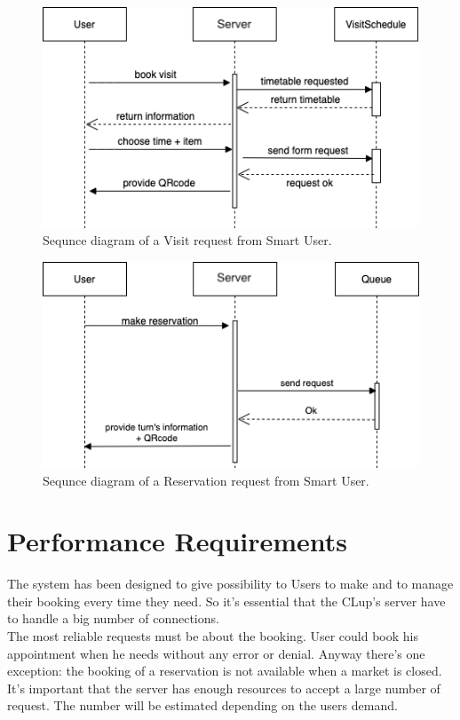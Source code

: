 \begin{figure}[H]
  \caption{Sequnce diagram of a Visit request from Smart User.}
  \label{fig:SD_visit}
  \centering
  \includegraphics[scale=0.45]{diagrams/SD_visit.png}

\end{figure}
\begin{figure}[H]
  \caption{Sequnce diagram of a Reservation request from Smart User.}
  \label{fig:SD_reservation}
  \centering
  \includegraphics[scale=0.45]{diagrams/SD_reservation.png}

\end{figure}

\section{Performance Requirements}
The system has been designed to give possibility to Users to make and to manage their booking every time they need. So it's essential that the CLup's server have to handle a big number of connections. \\
The most reliable requests must be about the booking. User could book his appointment when he needs without any error or denial. 
Anyway there's one exception: the booking of a reservation is not available when a market is closed.\\
It's important that the server has enough resources to accept a large number of request. The number will be estimated depending on the users demand.\\
